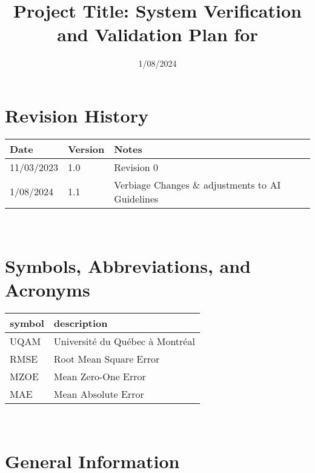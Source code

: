 \documentclass[12pt, titlepage]{article}
\begin{document}
\title{Project Title: System Verification and Validation Plan for \progname{}} 
\author{\authname}
\date{1/08/2024}
	
\maketitle


\section*{Revision History}

\begin{tabularx}{\textwidth}{p{3cm}p{2cm}X}
\toprule {\bf Date} & {\bf Version} & {\bf Notes}\\
\midrule
11/03/2023 & 1.0 & Revision 0\\
1/08/2024 & 1.1 & Verbiage Changes \& adjustments to AI Guidelines \\
\bottomrule
\end{tabularx}

~\\

\newpage

\tableofcontents

\listoftables

\newpage

\section{Symbols, Abbreviations, and Acronyms}

\renewcommand{\arraystretch}{1.2}
\begin{tabular}{l l} 
  \toprule		
  \textbf{symbol} & \textbf{description}\\
  \midrule 
  UQAM & Université du Québec à Montréal\\
  RMSE & Root Mean Square Error\\
  MZOE & Mean Zero-One Error\\
  MAE & Mean Absolute Error\\
  \bottomrule
\end{tabular}\\

\newpage


\section{General Information}
\end{document}
